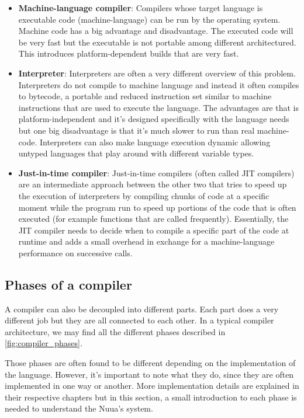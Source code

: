 \begin{itemize}
    \item \textbf{Machine-language compiler}: Compilers whose target language is executable code (machine-language) can be run
        by the operating system. Machine code has a big advantage and disadvantage. The executed code will be very fast but the executable is not portable among different architectured. This introduces platform-dependent builds that are very fast.
    \item \textbf{Interpreter}: Interpreters are often a very different overview of this problem. Interpreters do not compile
        to machine language and instead it often compiles to bytecode, a portable and reduced instruction set similar to machine instructions that are used to execute the language. The advantages are that is platform-independent and it's designed specifically with the language needs but one big disadvantage is that it's much slower to run than real machine-code. Interpreters can also make language execution dynamic allowing untyped languages that play around with different variable types.
    \item \textbf{Just-in-time compiler}: Just-in-time compilers (often called JIT compilers) are an intermediate approach between the other two
        that tries to speed up the execution of interpreters by compiling chunks of code at a specific moment while the program run to speed up portions of the code that is often executed (for example functions that are called frequently). Essentially, the JIT compiler needs to decide when to compile a specific part of the code at runtime and adds a small overhead in exchange for a machine-language performance on successive calls.
\end{itemize}

\subsection{Phases of a compiler}

A compiler can also be decoupled into different parts. Each part does a very different job but they are all connected to each other.
In a typical compiler architecture, we may find all the different phases described in \autoref{fig:compiler_phases}.

Those phases are often found to be different depending on the implementation of the language. However, it's important to note what they do,
since they are often implemented in one way or another. More implementation details are explained in their respective chapters but in this
section, a small introduction to each phase is needed to understand the Nuua's system.

